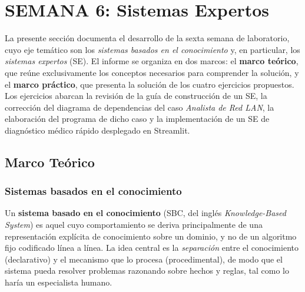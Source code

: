 
\providecommand{\TODO}[1]{\textcolor{red}{\textbf{[PENDIENTE: #1]}}}

\section{SEMANA 6: Sistemas Expertos}
\label{sec:semana6}

La presente secci\'on documenta el desarrollo de la sexta semana de
laboratorio, cuyo eje tem\'atico son los \emph{sistemas basados en el
conocimiento} y, en particular, los \emph{sistemas expertos} (SE). El
informe se organiza en dos marcos: el \textbf{marco te\'orico}, que
re\'une exclusivamente los conceptos necesarios para comprender la
soluci\'on, y el \textbf{marco pr\'actico}, que presenta la soluci\'on
de los cuatro ejercicios propuestos. Los ejercicios abarcan la revisi\'on
de la gu\'ia de construcci\'on de un SE, la correcci\'on del diagrama de
dependencias del caso \emph{Analista de Red LAN}, la elaboraci\'on del
programa de dicho caso y la implementaci\'on de un SE de diagn\'ostico
m\'edico r\'apido desplegado en Streamlit.

\subsection{Marco Te\'orico}

\subsubsection{Sistemas basados en el conocimiento}

Un \textbf{sistema basado en el conocimiento} (SBC, del ingl\'es
\emph{Knowledge-Based System}) es aquel cuyo comportamiento se deriva
principalmente de una representaci\'on expl\'icita de conocimiento sobre
un dominio, y no de un algoritmo fijo codificado l\'inea a l\'inea. La
idea central es la \emph{separaci\'on} entre el conocimiento
(declarativo) y el mecanismo que lo procesa (procedimental), de modo que
el sistema pueda resolver problemas razonando sobre hechos y reglas,
tal como lo har\'ia un especialista humano.

